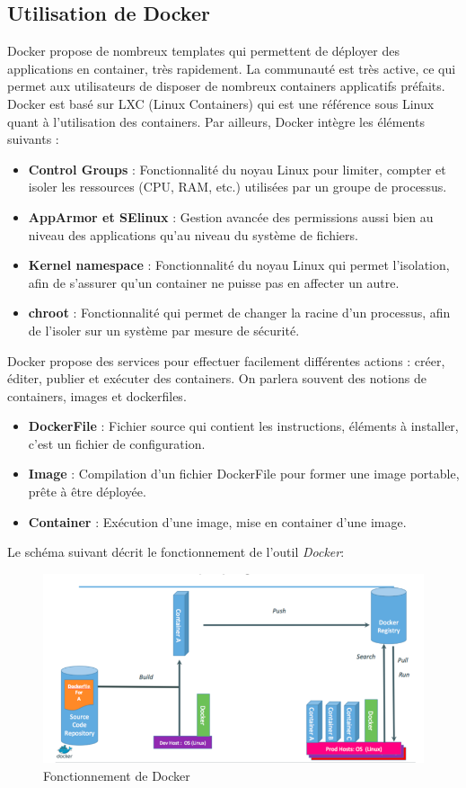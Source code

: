 \begin{onehalfspace}
\subsection{Utilisation de Docker}
Docker propose de nombreux templates qui permettent de déployer des applications en container, très rapidement. La communauté est très active, ce qui permet aux utilisateurs de disposer de nombreux containers applicatifs préfaits.
Docker est basé sur LXC (Linux Containers) qui est une référence sous Linux quant à l’utilisation des containers. Par ailleurs, Docker intègre les éléments suivants :
\begin{itemize}
\item \textbf{Control Groups} : Fonctionnalité du noyau Linux pour limiter, compter et isoler les ressources (CPU, RAM, etc.) utilisées par un groupe de processus.
\item \textbf{AppArmor et SElinux} : Gestion avancée des permissions aussi bien au niveau des applications qu’au niveau du système de fichiers.
\item \textbf{Kernel namespace} : Fonctionnalité du noyau Linux qui permet l’isolation, afin de s’assurer qu’un container ne puisse pas en affecter un autre.
\item \textbf{chroot} : Fonctionnalité qui permet de changer la racine d’un processus, afin de l’isoler sur un système par mesure de sécurité.
\end{itemize}

Docker propose des services pour effectuer facilement différentes actions : créer, éditer, publier et exécuter des containers. On parlera souvent des notions de containers, images et dockerfiles.

\begin{itemize}
\item \textbf{DockerFile} : Fichier source qui contient les instructions, éléments à installer, c’est un fichier de configuration.
\item \textbf{Image} : Compilation d’un fichier DockerFile pour former une image portable, prête à être déployée.
\item \textbf{Container} : Exécution d’une image, mise en container d’une image.
\end{itemize}


Le schéma suivant décrit le fonctionnement de l'outil \emph{Docker}: 
\begin{figure}[H]
\centering
\includegraphics [scale=0.6]{chapitre2/assets/utilisation.png}
\caption{Fonctionnement de Docker}
\end{figure}

\end{onehalfspace}
\label{table:} %
